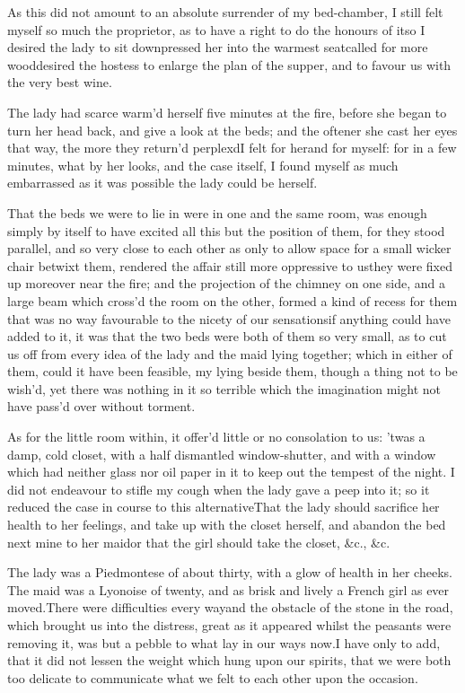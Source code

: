 \documentclass[twoside]{article}
\begin{document}
As this did not amount to an absolute
surrender of my bed-chamber, I still felt
myself so much the proprietor, as to have
a right to do the honours of it\tskk so I
desired the lady to sit down\tskk pressed
her into the warmest seat\tskk called for
more wood\tskk desired the hostess to
enlarge the plan of the supper, and to
favour us with the very best wine.

The lady had scarce warm’d herself five
minutes at the fire, before she began to
turn her head back, and give a look at the
beds; and the oftener she cast her eyes
that way, the more they return’d
perplexd\tskk I felt for her\tskk and for
myself: for in a few minutes, what by her
looks, and the case itself, I found myself
as much embarrassed as it was possible the
lady could be herself.

That the beds we were to lie in were in
one and the same room, was enough simply
by itself to have excited all this\tskk
but the position of them, for they stood
parallel, and so very close to each other
as only to allow space for a small wicker
chair betwixt them, rendered the affair
still more oppressive to us\tskk they
were fixed up moreover near the fire; and
the projection of the chimney on one side,
and a large beam which cross’d the room on
the other, formed a kind of recess for
them that was no way favourable to the
nicety of our sensations\tskk if anything
could have added to it, it was that the
two beds were both of them so very small,
as to cut us off from every idea of the
lady and the maid lying together; which in
either of them, could it have been
feasible, my lying beside them, though a
thing not to be wish’d, yet there was
nothing in it so terrible which the
imagination might not have pass’d over
without torment.

As for the little room within, it offer’d
little or no consolation to us: ’twas a
damp, cold closet, with a half dismantled
window-shutter, and with a window which
had neither glass nor oil paper in it to
keep out the tempest of the night.  I did
not endeavour to stifle my cough when the
lady gave a peep into it; so it reduced
the case in course to this
alternative\tskk That the lady should
sacrifice her health to her feelings, and
take up with the closet herself, and
abandon the bed next mine to her
maid\tskk or that the girl should take
the closet, \&c., \&c.

The lady was a Piedmontese of about
thirty, with a glow of health in her
cheeks.  The maid was a Lyonoise of
twenty, and as brisk and lively a French
girl as ever moved.\tskk There were
difficulties every way\tskk and the
obstacle of the stone in the road, which
brought us into the distress, great as it
appeared whilst the peasants were removing
it, was but a pebble to what lay in our
ways now.\tskk I have only to add, that it
did not lessen the weight which hung upon
our spirits, that we were both too
delicate to communicate what we felt to
each other upon the occasion.
\end{document}
